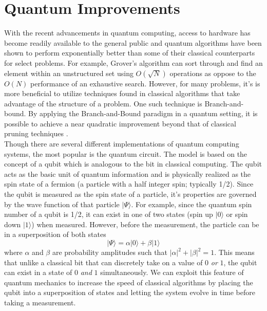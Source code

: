 \newpage
\section{Quantum Improvements}
	With the recent advancements in quantum computing, access to hardware has become readily available to the general public and quantum algorithms have been shown to perform exponentially better than some of their classical counterparts for select problems. 
	For example, Grover's algorithm can sort through and find an element within an unstructured set using $O(\sqrt{N})$ operations as oppose to the $O(N)$ performance of an exhaustive search. However, for many problems, it's is more beneficial to utilize techniques found in classical algorithms that take advantage of the structure of a problem. One such technique is Branch-and-bound. 
	By applying the Branch-and-Bound paradigm in a quantum setting, it is possible to achieve a near quadratic improvement beyond that of classical pruning techniques \cite{montanaro2020quantum}. \\
	

	Though there are several different implementations of quantum computing systems, the most popular is the quantum circuit.
	The model is based on the concept of a qubit which is analogous to the bit in classical computing. 
	The qubit acts as the basic unit of quantum information and is physically realized as the spin state of a fermion (a particle with a half integer spin; typically 1/2). 
	Since the qubit is measured as the spin state of a particle, it's properties are governed by the wave function of that particle $|\Psi\rangle$. 
	For example, since the quantum spin number of a qubit is 1/2, it can exist in one of two states (spin up $|0\rangle$ or spin down $|1\rangle$) when measured. 
	However, before the measurement, the particle can be in a superposition of both states 
	\begin{equation}
		|\Psi\rangle = \alpha |0\rangle + \beta|1\rangle
		\label{eq:spinStates}
	\end{equation}
	where $\alpha$ and $\beta$ are probability amplitudes such that $|\alpha|^2+|\beta|^2 = 1$.
	This means that unlike a classical bit that can discretely take on a value of $0$ \textit{or} $1$, the qubit can exist in a state of $0$ \textit{and} $1$ simultaneously. We can exploit this feature of quantum mechanics to increase the speed of classical algorithms by placing the qubit into a superposition of states and letting the system evolve in time before taking a measurement. 
	
